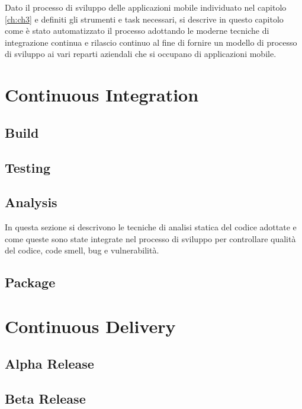 
Dato il processo di sviluppo delle applicazioni mobile individuato nel capitolo \ref{ch:ch3} e definiti gli strumenti e task necessari, si descrive in questo capitolo come è stato automatizzato il processo adottando le moderne tecniche di integrazione continua e rilascio continuo al fine di fornire un modello di processo di sviluppo ai vari reparti aziendali che si occupano di applicazioni mobile.

\section{Continuous Integration}

\subsection{Build}

\subsection{Testing}

\subsection{Analysis}
In questa sezione si descrivono le tecniche di analisi statica del codice adottate e come queste sono state integrate nel processo di sviluppo per controllare qualità del codice, code smell, bug e vulnerabilità.

\subsection{Package}

\section{Continuous Delivery}

\subsection{Alpha Release}

\subsection{Beta Release}

